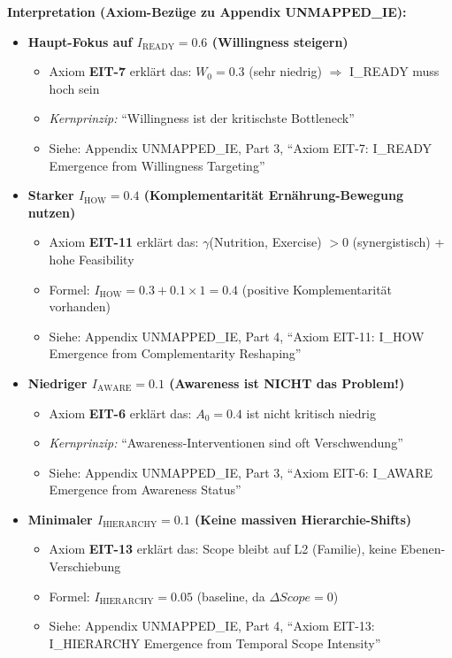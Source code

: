 \textbf{Interpretation (Axiom-Bezüge zu Appendix UNMAPPED_IE):}
\begin{itemize}[nosep]
\item \textbf{Haupt-Fokus auf $I_{\text{READY}} = 0.6$ (Willingness steigern)}
  \begin{itemize}[nosep]
  \item Axiom \textbf{EIT-7} erklärt das: $W_0 = 0.3$ (sehr niedrig) $\Rightarrow$ I_READY muss hoch sein
  \item \textit{Kernprinzip:} ``Willingness ist der kritischste Bottleneck''
  \item Siehe: Appendix UNMAPPED_IE, Part 3, ``Axiom EIT-7: I_READY Emergence from Willingness Targeting''
  \end{itemize}

\item \textbf{Starker $I_{\text{HOW}} = 0.4$ (Komplementarit\"{a}t Ern\"{a}hrung-Bewegung nutzen)}
  \begin{itemize}[nosep]
  \item Axiom \textbf{EIT-11} erklärt das: $\gamma$(Nutrition, Exercise) $> 0$ (synergistisch) + hohe Feasibility
  \item Formel: $I_{\text{HOW}} = 0.3 + 0.1 \times 1 = 0.4$ (positive Komplementarität vorhanden)
  \item Siehe: Appendix UNMAPPED_IE, Part 4, ``Axiom EIT-11: I_HOW Emergence from Complementarity Reshaping''
  \end{itemize}

\item \textbf{Niedriger $I_{\text{AWARE}} = 0.1$ (Awareness ist \textbf{NICHT} das Problem!)}
  \begin{itemize}[nosep]
  \item Axiom \textbf{EIT-6} erklärt das: $A_0 = 0.4$ ist nicht kritisch niedrig
  \item \textit{Kernprinzip:} ``Awareness-Interventionen sind oft Verschwendung''
  \item Siehe: Appendix UNMAPPED_IE, Part 3, ``Axiom EIT-6: I_AWARE Emergence from Awareness Status''
  \end{itemize}

\item \textbf{Minimaler $I_{\text{HIERARCHY}} = 0.1$ (Keine massiven Hierarchie-Shifts)}
  \begin{itemize}[nosep]
  \item Axiom \textbf{EIT-13} erklärt das: Scope bleibt auf L2 (Familie), keine Ebenen-Verschiebung
  \item Formel: $I_{\text{HIERARCHY}} = 0.05$ (baseline, da $\Delta Scope = 0$)
  \item Siehe: Appendix UNMAPPED_IE, Part 4, ``Axiom EIT-13: I_HIERARCHY Emergence from Temporal Scope Intensity''
  \end{itemize}
\end{itemize}

